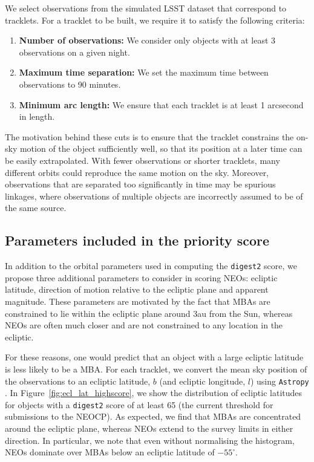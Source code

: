 \documentclass[twocolumn, twocolappendix]{aastex631}
\newcommand{\dig}{\texttt{digest2}}
\begin{document}
We select observations from the simulated LSST dataset that correspond to tracklets. For a tracklet to be built, we require it to satisfy the following criteria:
\begin{enumerate}
    \item \textbf{Number of observations:} We consider only objects with at least 3 observations on a given night.
    \item \textbf{Maximum time separation:} We set the maximum time between observations to 90 minutes.
    \item \textbf{Minimum arc length:} We ensure that each tracklet is at least 1 arcsecond in length.
\end{enumerate}
The motivation behind these cuts is to ensure that the tracklet constrains the on-sky motion of the object sufficiently well, so that its position at a later time can be easily extrapolated. With fewer observations or shorter tracklets, many different orbits could reproduce the same motion on the sky. Moreover, observations that are separated too significantly in time may be spurious linkages, where observations of multiple objects are incorrectly assumed to be of the same source.

\subsection{Parameters included in the priority score}

In addition to the orbital parameters used in computing the \dig{} score, we propose three additional parameters to consider in scoring NEOs: ecliptic latitude, direction of motion relative to the ecliptic plane and apparent magnitude. These parameters are motivated by the fact that MBAs are constrained to lie within the ecliptic plane around 3au from the Sun, whereas NEOs are often much closer and are not constrained to any location in the ecliptic.

For these reasons, one would predict that an object with a large ecliptic latitude is less likely to be a MBA. For each tracklet, we convert the mean sky position of the observations to an ecliptic latitude, $b$ (and ecliptic longitude, $l$) using \texttt{Astropy} \citep{astropy:2013,astropy:2018,astropy:2022}. In Figure~\ref{fig:ecl_lat_highscore}, we show the distribution of ecliptic latitudes for objects with a \dig{} score of at least 65 (the current threshold for submissions to the NEOCP). As expected, we find that MBAs are concentrated around the ecliptic plane, whereas NEOs extend to the survey limits in either direction. In particular, we note that even without normalising the histogram, NEOs dominate over MBAs below an ecliptic latitude of $-55^{\circ}$.
\end{document}
